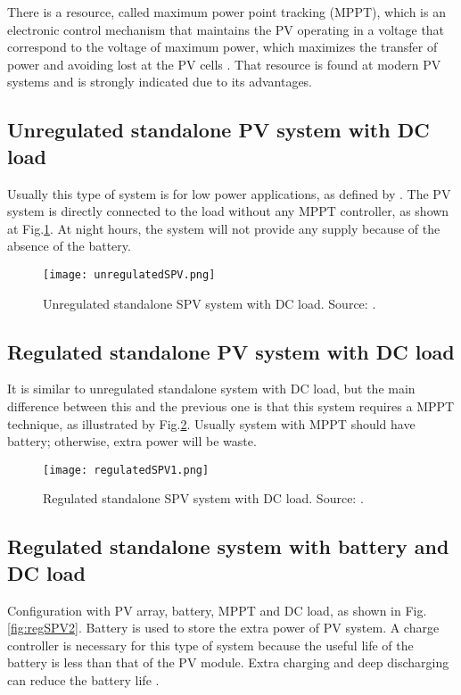 There is a resource, called maximum power point tracking (MPPT), which is an electronic control mechanism that maintains the PV operating in a voltage that correspond to the voltage of maximum power, which maximizes the transfer of power and avoiding lost at the PV cells \cite{Pinho}. That resource is found at modern PV systems and is strongly indicated due to its advantages.

\subsection{Unregulated standalone PV system with DC load }
Usually this type of system is for low power applications, as defined by \cite{Roy}. The PV system is directly connected to the load without any MPPT controller, as shown at Fig.\ref{fig:unregSPV}. At night hours, the system will not provide any supply because of the absence of the battery. 
 
\begin{figure}[h]
\texttt{[image: unregulatedSPV.png]}
\centering
\caption{Unregulated standalone SPV system with DC load. Source: \cite{Roy}.}
\label{fig:unregSPV}
\end{figure}

\subsection{Regulated standalone PV system with DC load}
It is similar to unregulated standalone system with DC load, but the main difference between this and the previous one is that this system requires a MPPT technique, as illustrated by Fig.\ref{fig:regSPV1}. Usually system with MPPT should have battery; otherwise, extra power will be waste.

\begin{figure}[h]
\texttt{[image: regulatedSPV1.png]}
\centering
\caption{Regulated standalone SPV system with DC load. Source: \cite{Roy}.}
\label{fig:regSPV1}
\end{figure}

\subsection{Regulated standalone system with battery and DC load}

Configuration with PV array, battery, MPPT and DC load, as shown in Fig.\ref{fig:regSPV2}. Battery is used to store the extra power of PV system. A charge controller is necessary for this type of system because the useful life of the battery is less than that of the PV module. Extra charging and deep discharging can reduce the battery life \cite{Kim}. 

